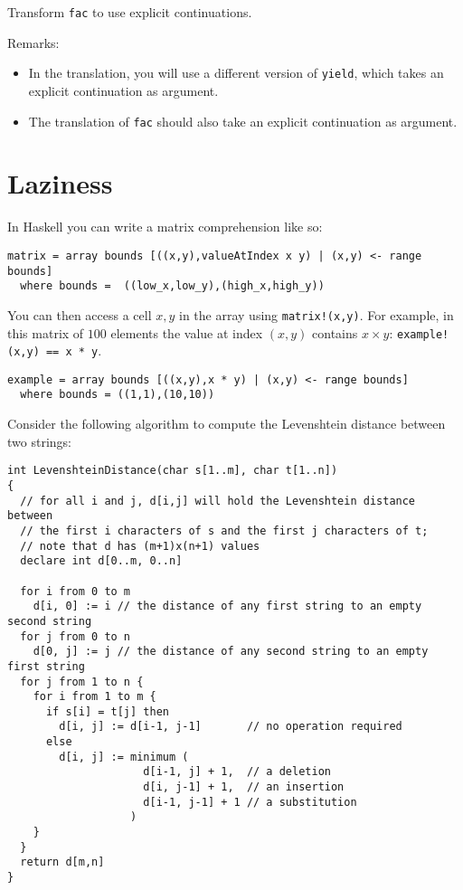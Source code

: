 \documentclass[7pt]{article}
\begin{document}
Transform \texttt{fac} to use explicit continuations.

Remarks: 
\begin{itemize}
\item In the translation, you will use a different version of
  \texttt{yield}, which takes an explicit continuation as argument.
\item The translation of \texttt{fac} should also take an explicit
  continuation as argument.
\end{itemize}

\section{Laziness}
In Haskell you can write a matrix comprehension like so:
\begin{verbatim}
matrix = array bounds [((x,y),valueAtIndex x y) | (x,y) <- range bounds]
  where bounds =  ((low_x,low_y),(high_x,high_y))
\end{verbatim}

You can then access a cell $x,y$ in the array using \texttt{matrix!(x,y)}.
%
For example, in this matrix of $100$ elements the value at index $(x,y)$ contains $x ×
y$: \texttt{example!(x,y) == x * y}.
\begin{verbatim}
example = array bounds [((x,y),x * y) | (x,y) <- range bounds]
  where bounds = ((1,1),(10,10))
\end{verbatim}

Consider the following algorithm to compute the Levenshtein distance between two strings:
{\small
\begin{verbatim}
int LevenshteinDistance(char s[1..m], char t[1..n])
{
  // for all i and j, d[i,j] will hold the Levenshtein distance between
  // the first i characters of s and the first j characters of t;
  // note that d has (m+1)x(n+1) values
  declare int d[0..m, 0..n]

  for i from 0 to m
    d[i, 0] := i // the distance of any first string to an empty second string
  for j from 0 to n
    d[0, j] := j // the distance of any second string to an empty first string
  for j from 1 to n {
    for i from 1 to m {
      if s[i] = t[j] then
        d[i, j] := d[i-1, j-1]       // no operation required
      else
        d[i, j] := minimum (
                     d[i-1, j] + 1,  // a deletion
                     d[i, j-1] + 1,  // an insertion
                     d[i-1, j-1] + 1 // a substitution
                   )
    }
  }
  return d[m,n]
}
\end{verbatim}
}
\end{document}
